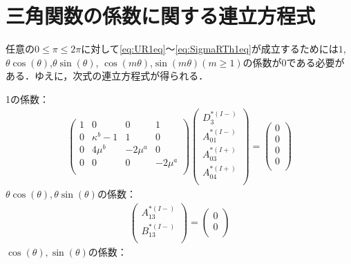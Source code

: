 \section{三角関数の係数に関する連立方程式}

任意の$0\leq\pi\leq2\pi$に対して\eqref{eq:UR1eq}～\eqref{eq:SigmaRTh1eq}が成立するためには$1$,$\theta\cos(\theta)$,$\theta\sin(\theta)$,
$\cos(m\theta)$,$\sin(m\theta)$$(m\geq1)$の係数が0である必要がある．ゆえに，次式の連立方程式が得られる．

1の係数：
\begin{align}
	\left(
	\begin{array}{cccc}
		1& 0 & 0 & 1 \\
		0 & \kappa^b-1 & 1 & 0 \\
		0 & 4\mu^{b} & -2\mu^{a} & 0 \\
		0 & 0 & 0 & -2\mu^{a} \\
	\end{array}
	\right)
	\left(
	\begin{array}{c}
		D_{3}^{*(I-)} \\
	 	A_{01}^{*(I-)} \\
		A_{03}^{*(I+)}\\
	 	A_{04}^{*(I+)} \\
	\end{array}
	\right)
	=
	\left(
	\begin{array}{c}
		0 \\
	 	0 \\
		0 \\
	 	0 \\
	\end{array}
	\right)
\end{align}
$\theta\cos(\theta),\theta\sin(\theta)$の係数：
\begin{align}
	\left(
	\begin{array}{c}
		A_{13}^{*(I-)} \\
	 	B_{13}^{*(I-)} \\
	\end{array}
	\right)
	=
	\left(
	\begin{array}{c}
		0 \\
	 	0 \\
	\end{array}
	\right)
\end{align}
$\cos(\theta),\sin(\theta)$の係数：
